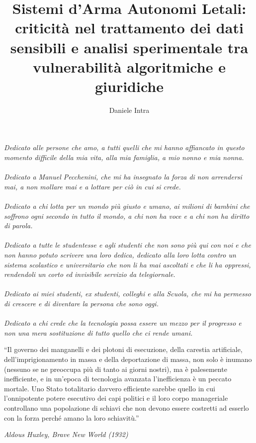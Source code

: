 \documentclass[a4paper,12pt]{report}
\begin{document}
\title{Sistemi d'Arma Autonomi Letali: \\criticità nel trattamento dei dati sensibili e analisi sperimentale tra vulnerabilità algoritmiche e giuridiche}
\author{Daniele Intra}

\beforepreface

{\hfill \Large {\sl Dedicato alle persone che amo, a tutti quelli che mi hanno affiancato in questo momento difficile della mia vita, alla mia famiglia, a mio nonno e mia nonna.\\\\
Dedicato a Manuel Pecchenini, che mi ha insegnato la forza di non arrendersi mai, a non mollare mai e a lottare per ciò in cui si crede.\\\\
Dedicato a chi lotta per un mondo più giusto e umano, ai milioni di bambini che soffrono ogni secondo in tutto il mondo, a chi non ha voce e a chi non ha diritto di parola.\\\\
Dedicato a tutte le studentesse e agli studenti che non sono più qui con noi e che non hanno potuto scrivere una loro dedica, dedicato alla loro lotta contro un sistema scolastico e universitario che non li ha mai ascoltati e che li ha oppressi, rendendoli un corto ed invisibile servizio da telegiornale.\\\\
Dedicato ai miei studenti, ex studenti, colleghi e alla Scuola, che mi ha permesso di crescere e di diventare la persona che sono oggi.\\\\
Dedicato a chi crede che la tecnologia possa essere un mezzo per il progresso e non una mera sostituzione di tutto quello che ci rende umani. }}

\begin{flushright}
\begin{minipage}{0.6\textwidth}
\epigraph{
    ``Il governo dei manganelli e dei plotoni di esecuzione, della carestia artificiale, dell'imprigionamento in massa e della deportazione di massa, non solo è inumano (nessuno se ne preoccupa più di tanto ai giorni nostri), ma è palesemente inefficiente, e in un'epoca di tecnologia avanzata l'inefficienza è un peccato mortale. Uno Stato totalitario davvero efficiente sarebbe quello in cui l'onnipotente potere esecutivo dei capi politici e il loro corpo manageriale controllano una popolazione di schiavi che non devono essere costretti ad esserlo con la forza perché amano la loro schiavitù.''
}{\textit{Aldous Huxley, Brave New World (1932)}}
\end{minipage}
\end{flushright}
\end{document}
